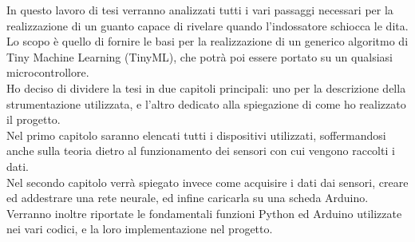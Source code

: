 

\label{02-chapter}

In questo lavoro di tesi verranno analizzati tutti i vari passaggi necessari per la realizzazione di un guanto capace di rivelare quando l'indossatore schiocca le dita.
Lo scopo è quello di fornire le basi per la realizzazione di un generico algoritmo di Tiny Machine Learning (TinyML), che potrà poi essere portato su un qualsiasi microcontrollore.\\

\noindent{}Ho deciso di dividere la tesi in due capitoli principali: uno per la descrizione della strumentazione utilizzata, e l'altro dedicato alla spiegazione di come ho realizzato il progetto.\\

\noindent{}Nel primo capitolo saranno elencati tutti i dispositivi utilizzati, soffermandosi anche sulla teoria dietro al funzionamento dei sensori con cui vengono raccolti i dati.\\

\noindent{}Nel secondo capitolo verrà spiegato invece come acquisire i dati dai sensori, creare ed addestrare una rete neurale, ed infine caricarla su una scheda Arduino. Verranno inoltre riportate le fondamentali funzioni Python ed Arduino utilizzate nei vari codici, e la loro implementazione nel progetto.\\